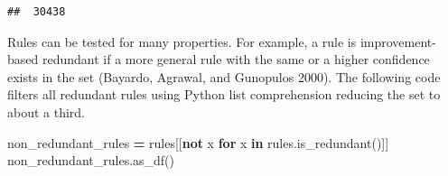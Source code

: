 \documentclass{article}
\newenvironment{Shaded}{\begin{snugshade}}{\end{snugshade}}
\newcommand{\ControlFlowTok}[1]{\textcolor[rgb]{0.13,0.29,0.53}{\textbf{#1}}}
\newcommand{\KeywordTok}[1]{\textcolor[rgb]{0.13,0.29,0.53}{\textbf{#1}}}
\newcommand{\NormalTok}[1]{#1}
\newcommand{\OperatorTok}[1]{\textcolor[rgb]{0.81,0.36,0.00}{\textbf{#1}}}
\begin{document}
\begin{verbatim}
##  30438
\end{verbatim}

Rules can be tested for many properties. For example, a rule is
improvement-based redundant if a more general rule with the same or a
higher confidence exists in the set (Bayardo, Agrawal, and Gunopulos
2000). The following code filters all redundant rules using Python list
comprehension reducing the set to about a third.

\begin{Shaded}
\begin{Highlighting}[]
\NormalTok{non\_redundant\_rules }\OperatorTok{=}\NormalTok{ rules[[}\KeywordTok{not}\NormalTok{ x }\ControlFlowTok{for}\NormalTok{ x }\KeywordTok{in}\NormalTok{ rules.is\_redundant()]]}
\NormalTok{non\_redundant\_rules.as\_df()}
\end{Highlighting}
\end{Shaded}
\end{document}
